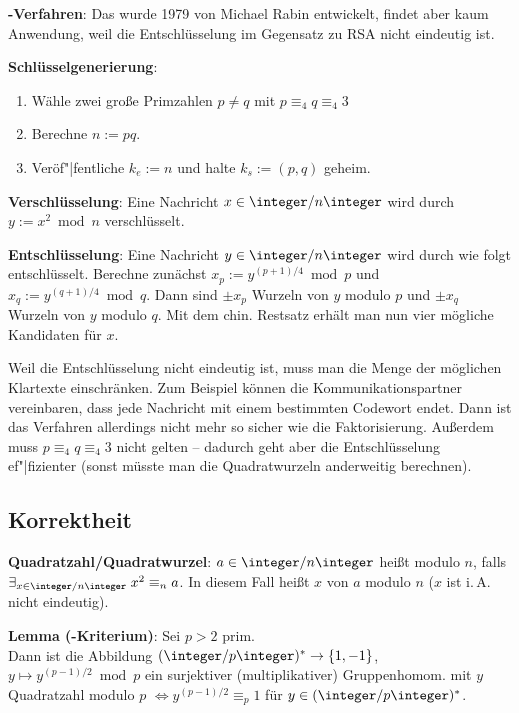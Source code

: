 \textbf{-Verfahren}:
Das  wurde 1979 von Michael Rabin entwickelt, findet aber
kaum Anwendung, weil die Entschlüsselung im Gegensatz zu RSA nicht eindeutig ist.

\textbf{Schlüsselgenerierung}:
\begin{enumerate}
    \item
    Wähle zwei große Primzahlen $p \not= q$ mit $p \equiv_4 q \equiv_4 3$

    \item
    Berechne $n := pq$.

    \item
    Veröf"|fentliche $k_e := n$ und halte $k_s := (p, q)$ geheim.
\end{enumerate}

\textbf{Verschlüsselung}:
Eine Nachricht $x \in \ZnZ$ wird durch $y := x^2 \bmod n$ verschlüsselt.

\textbf{Entschlüsselung}:
Eine Nachricht $y \in \ZnZ$ wird durch wie folgt entschlüsselt.
Berechne zunächst $x_p := y^{(p+1)/4} \bmod p$ und $x_q := y^{(q+1)/4} \bmod q$.
Dann sind $\pm x_p$ Wurzeln von $y$ modulo $p$ und
$\pm x_q$ Wurzeln von $y$ modulo $q$.
Mit dem chin. Restsatz erhält man nun vier mögliche Kandidaten für $x$.

Weil die Entschlüsselung nicht eindeutig ist, muss man die Menge der möglichen Klartexte
einschränken.
Zum Beispiel können die Kommunikationspartner vereinbaren, dass jede Nachricht mit einem
bestimmten Codewort endet.
Dann ist das Verfahren allerdings nicht mehr so sicher wie die Faktorisierung.
Außerdem muss $p \equiv_4 q \equiv_4 3$ nicht gelten --
dadurch geht aber die Entschlüsselung ef"|fizienter
(sonst müsste man die Quadratwurzeln anderweitig berechnen).

\subsection{%
    Korrektheit%
}

\textbf{Quadratzahl/Quadratwurzel}:
$a \in \ZnZ$ heißt  modulo $n$, falls
$\exists_{x \in \ZnZ}\; x^2 \equiv_n a$.
In diesem Fall heißt $x$  von $a$ modulo $n$
($x$ ist i.\,A. nicht eindeutig).

\textbf{Lemma (-Kriterium)}:
Sei $p > 2$ prim.\\
Dann ist die Abbildung $(\ZpZ)^\ast \rightarrow \{1, -1\}$,
$y \mapsto y^{(p-1)/2} \bmod p$ ein surjektiver (multiplikativer) Gruppenhomom. mit
$y$ Quadratzahl modulo $p$ $\iff y^{(p-1)/2} \equiv_p 1$
für $y \in (\ZpZ)^\ast$.


